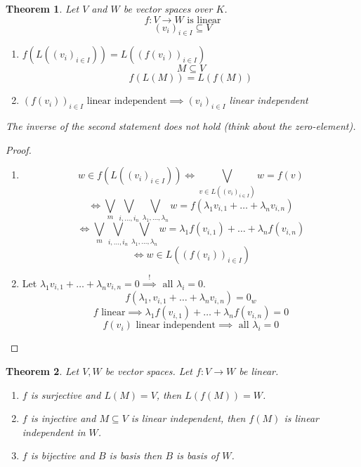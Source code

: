 \documentclass[a4paper,landscape,twocolumn]{article}
\newtheorem{theorem}{Theorem}[section]
\begin{document}
\begin{theorem}
  \label{satz-5.12}
  Let $V$ and $W$ be vector spaces over $K$.
  \[ f: V \rightarrow W \text{ is linear} \]
  \[ (v_i)_{i \in I} \subseteq V \]
  \begin{enumerate}
    \item $f(L((v_i)_{i\in I})) = L((f(v_i))_{i \in I})$
      \[ M \subseteq V \]
      \[ f(L(M)) = L(f(M)) \]
    \item $\left(f(v_i)\right)_{i \in I} \text{ linear independent} \implies (v_i)_{i \in I}$ linear independent
  \end{enumerate}
  The inverse of the second statement does not hold (think about the zero-element).
\end{theorem}
\begin{proof}
  \begin{enumerate}
    \item
      \[ w \in f(L((v_i)_{i \in I})) \iff \bigvee_{v \in L((v_i)_{i \in I})} w = f(v) \]
      \[ \iff \bigvee_{m} \bigvee_{i, \dots, i_n} \bigvee_{\lambda_1, \dots, \lambda_n} w = f(\lambda_1 v_{i,1} + \dots + \lambda_n v_{i,n}) \]
      \[ \iff \bigvee_{m} \bigvee_{i, \dots, i_n} \bigvee_{\lambda_1, \dots, \lambda_n} w = \lambda_1 f(v_{i,1}) + \dots + \lambda_n f(v_{i,n}) \]
      \[ \iff w \in L((f(v_i))_{i \in I}) \]
    \item
      Let $\lambda_1 v_{i,1} + \dots + \lambda_n v_{i,n} = 0 \stackrel{!}{\implies} \text{ all } \lambda_i = 0$.
      \[ f(\lambda_1, v_{i,1} + \dots + \lambda_n v_{i,n}) = 0_w \]
      \[ f \text{ linear} \implies \lambda_1 f(v_{i,1}) + \dots + \lambda_n f(v_{i,n}) = 0 \]
      \[ f(v_i) \text{ linear independent} \implies \text{ all } \lambda_i = 0 \]
  \end{enumerate}
\end{proof}

\begin{theorem}
  \label{satz-5-13}
  Let $V, W$ be vector spaces. Let $f: V \rightarrow W$ be linear.
  \begin{enumerate}
    \item $f$ is surjective and $L(M) = V$, then $L(f(M)) = W$.
    \item $f$ is injective and $M \subseteq V$ is linear independent, then $f(M)$ is linear independent in $W$.
    \item $f$ is bijective and $B$ is basis then $B$ is basis of $W$.
  \end{enumerate}
\end{theorem}
\end{document}
